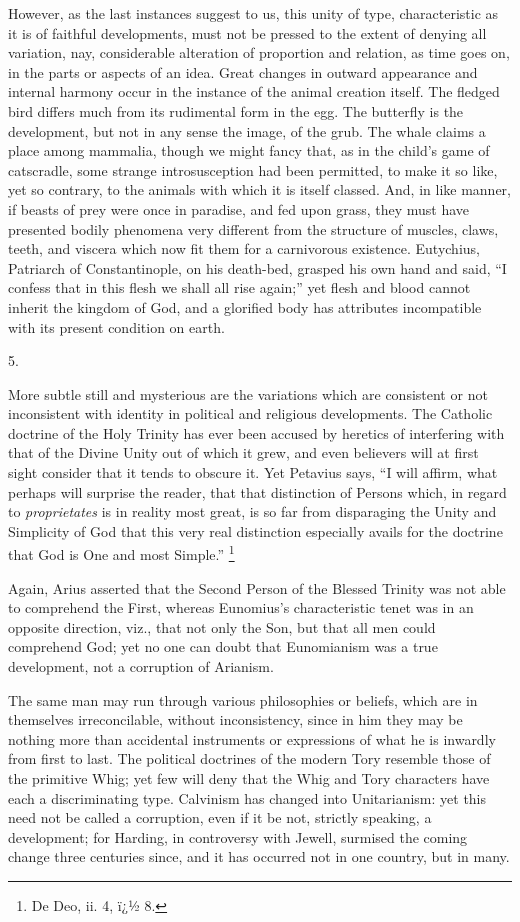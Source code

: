 However, as the last instances suggest to us, this
unity of type, characteristic as it is of faithful
developments, must not be pressed to the extent of
denying all variation, nay, considerable alteration of
proportion and relation, as time goes on, in the parts or
aspects of an idea. Great changes in outward appearance
and internal harmony occur in the instance of the animal
creation itself. The fledged bird differs much from its
rudimental form in the egg. The butterfly is the
development, but not in any sense the image, of the grub.
The whale claims a place among mammalia, though we might
fancy that, as in the child's game of catscradle, some
strange introsusception had been permitted, to make it so
like, yet so contrary, to the animals with which it is
itself classed. And, in like manner, if beasts of prey
were once in paradise, and fed upon grass, they must have
presented bodily phenomena very different from the
structure of muscles, claws, teeth, and viscera which now
fit them for a carnivorous existence. Eutychius,
Patriarch of Constantinople, on his death-bed, grasped
his own hand and said, ``I confess that in this flesh
we shall all rise again;'' yet flesh and blood cannot
inherit the kingdom of God, and a glorified body has
attributes incompatible with its present condition on
earth.

5.

More subtle still and mysterious are the variations
which are consistent or not inconsistent with identity in
political and religious developments. The Catholic
doctrine of the Holy Trinity has ever been accused by
heretics of interfering with that of the Divine Unity out
of which it grew, and even believers will at first sight
consider that it tends to obscure it. Yet Petavius says,
``I will affirm, what perhaps will surprise the
reader, that that distinction of Persons which, in regard
to \emph{proprietates} is in reality most great, is so
far from disparaging the Unity and Simplicity of God that
this very real distinction especially avails for the
doctrine that God is One and most Simple.'' \footnote{De Deo, ii. 4, ï¿½ 8.}

Again, Arius asserted that the Second Person of the
Blessed Trinity was not able to comprehend the First,
whereas Eunomius's characteristic tenet was in an
opposite direction, viz., that not only the Son, but that
all men could comprehend God; yet no one can doubt that
Eunomianism was a true development, not a corruption of
Arianism.

The same man may run through various philosophies or
beliefs, which are in themselves irreconcilable, without
inconsistency, since in him they may be nothing more than
accidental instruments or expressions of what he is
inwardly from first to last. The political doctrines of
the modern Tory resemble those of the primitive Whig; yet
few will deny that the Whig and Tory characters have each
a discriminating type. Calvinism has changed into
Unitarianism: yet this need not be called a corruption,
even if it be not, strictly speaking, a development; for
Harding, in controversy with Jewell, surmised the coming
change three centuries since, and it has occurred not in
one country, but in many.


